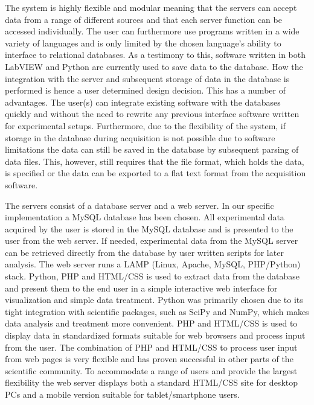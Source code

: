 The system is highly flexible and modular meaning that the servers can accept
data from a range of different sources and that each server function can be accessed individually. The user can furthermore use programs written in a wide variety of
languages and is only limited by the chosen language's ability to interface to
relational databases. As a testimony to this, software written in both LabVIEW
and Python\cite{python} are currently used to save data to the database.
How the
integration with the server and subsequent storage of data in the database is
performed is hence a user determined design decision. This has a number of
advantages. The user(s) can integrate existing software with the databases
quickly and without the need to rewrite any previous interface software written
for experimental setups. Furthermore, due to the flexibility of the system, if
storage in the database during acquisition is not possible due to software
limitations the data can still be saved in the database by subsequent parsing of data files. This, however, still requires that the file
format, which holds the data, is specified or the data can be exported to a
flat text format from the acquisition software.

The servers consist of a database server and a web server. In our specific
implementation a MySQL database has been chosen. All experimental data acquired
by the user is stored in the MySQL database and is presented to the user from
the web server. If needed, experimental data from the MySQL server can be
retrieved directly from the database by user written scripts for later
analysis. The web server runs a LAMP (Linux, Apache, MySQL, PHP/Python)
stack. Python, PHP and HTML/CSS is used to extract data from the database
and present them to the end user in a simple interactive web interface for
visualization and simple data treatment. Python was primarily chosen due
to its tight integration with scientific packages, such as SciPy and NumPy,
which makes data analysis and treatment more convenient\cite{Cahn2007}. PHP and
HTML/CSS is used to display data in standardized formats suitable for web
browsers and process input from the user. The combination of PHP and HTML/CSS
to process user input from web pages is very flexible and has proven successful
in other parts of the scientific community\cite{Crane2008}. To accommodate a
range of users and provide the largest flexibility the web server displays both
a standard HTML/CSS site for desktop PCs and a mobile version suitable for
tablet/smartphone users.


